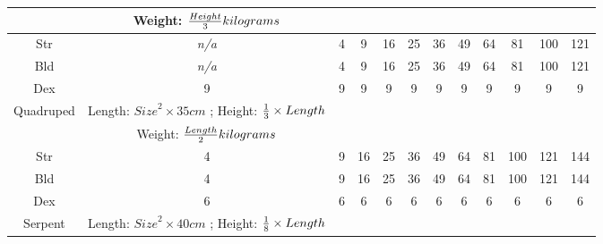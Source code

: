 \documentclass[twoside]{book}
\begin{document}
\begin{table}[htb]
\begin{center}
\begin{tabular}{|c|c|c|c|c|c|c|c|c|c|c|c|}
& Weight: \begin{math}    {{
                     Height}\over{ 3 }}  kilograms
                        \end{math}
                  \\

\hline

 Str &
                    \textit{n/a}
                  & 4 & 9 & 16 & 25 & 36 & 49 & 64 & 81 & 100 & 121 \\

\hline

 Bld &
                    \textit{n/a}
                  & 4 & 9 & 16 & 25 & 36 & 49 & 64 & 81 & 100 & 121 \\

\hline

 Dex & 9 & 9 & 9 & 9 & 9 & 9 & 9 & 9 & 9 & 9 & 9 \\

\hline

 Quadruped &  Length: \begin{math}  
                        {Size}^{ 2 }   \times     35 
                           cm  \end{math} ; Height: \begin{math} 
                           {{ 1 }\over{ 3 }}  
                           \times    Length  \end{math}
                  \\

\hline

&  Weight: \begin{math}    {{
                     Length}\over{ 2 }}  kilograms
                        \end{math}
                  \\

\hline

 Str & 4 & 9 & 16 & 25 & 36 & 49 & 64 & 81 & 100 & 121 & 144 \\

\hline

 Bld & 4 & 9 & 16 & 25 & 36 & 49 & 64 & 81 & 100 & 121 & 144 \\

\hline

 Dex & 6 & 6 & 6 & 6 & 6 & 6 & 6 & 6 & 6 & 6 & 6 \\

\hline

 Serpent &  Length: \begin{math}  
                        {Size}^{ 2 }   \times   40 cm
                            \end{math} ; Height: \begin{math} 
                           {{ 1 }\over{ 8 }}  
                           \times  Length  \end{math}
                  \\


\end{tabular}
\end{center}
\end{table}
\end{document}
